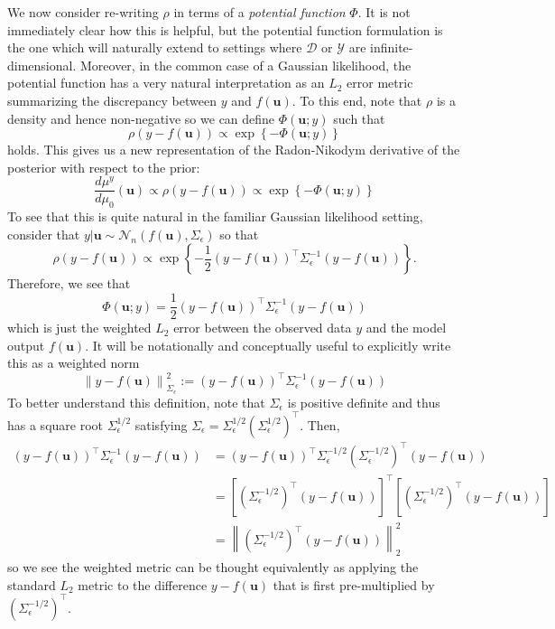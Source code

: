 \documentclass[12pt]{article}
\newcommand{\bpar}{\mathbf{u}} %
\newcommand*{\norm}[1]{\left\lVert#1\right\rVert}
\begin{document}
We now consider re-writing $\rho$ in terms of a \textit{potential function} $\Phi$. It is not immediately clear how this is helpful, but the potential function formulation is the one which will naturally extend to settings
where $\mathcal{D}$ or $\mathcal{Y}$ are infinite-dimensional. Moreover, in the common case of a Gaussian likelihood, the potential function has a very natural interpretation as an $L_2$ error metric summarizing 
the discrepancy between $y$ and $f(\bpar)$. To this end, note that $\rho$ is a density and hence non-negative so we can define $\Phi(\bpar; y)$ such that
\[\rho(y - f(\bpar)) \propto \exp\left\{-\Phi(\bpar; y)\right\}\]
holds. This gives us a new representation of the Radon-Nikodym derivative of the posterior with respect to the prior:
\[\frac{d\mu^y}{d\mu_0}(\bpar) \propto \rho(y - f(\bpar)) \propto \exp\left\{-\Phi(\bpar; y)\right\}\]
To see that this is quite natural in the familiar Gaussian likelihood setting, consider that $y|\bpar \sim \mathcal{N}_n(f(\bpar), \Sigma_\epsilon)$ so that 
\[\rho(y - f(\bpar)) \propto  \exp\left\{-\frac{1}{2}(y - f(\bpar))^{\top} \Sigma_\epsilon^{-1}(y - f(\bpar))\right\}.\]
Therefore, we see that 
\[\Phi(\bpar; y) = \frac{1}{2}(y - f(\bpar))^{\top} \Sigma_\epsilon^{-1}(y - f(\bpar))\]
which is just the weighted $L_2$ error between the observed data $y$ and the model output $f(\bpar)$. It will be notationally and conceptually useful to explicitly write this as a weighted norm 
\[\norm{y - f(\bpar)}^2_{\Sigma_{\epsilon}} := (y - f(\bpar))^{\top} \Sigma_\epsilon^{-1}(y - f(\bpar))\]
To better understand this definition, note that $\Sigma_\epsilon$ is positive definite and thus has a square root $\Sigma_\epsilon^{1/2}$ satisfying $\Sigma_\epsilon = \Sigma_\epsilon^{1/2} \left(\Sigma_\epsilon^{1/2}\right)^{\top}$. Then, 
\begin{align*}
(y - f(\bpar))^{\top} \Sigma_\epsilon^{-1}(y - f(\bpar)) &= (y - f(\bpar))^{\top} \Sigma_\epsilon^{-1/2} \left(\Sigma_\epsilon^{-1/2}\right)^{\top}(y - f(\bpar)) \\
									   &= \left[\left(\Sigma_\epsilon^{-1/2}\right)^{\top} (y - f(\bpar)) \right]^{\top} \left[\left(\Sigma_\epsilon^{-1/2}\right)^{\top} (y - f(\bpar)) \right] \\
									   &= \norm{\left(\Sigma_\epsilon^{-1/2}\right)^{\top} (y - f(\bpar))}_2^2
\end{align*}
so we see the weighted metric can be thought equivalently as applying the standard $L_2$ metric to the difference $y - f(\bpar)$ that is first pre-multiplied by $\left(\Sigma_\epsilon^{-1/2}\right)^{\top}$. 
\end{document}
